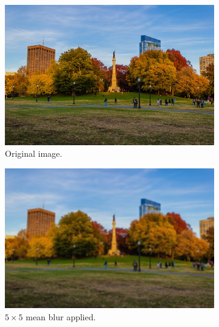 \documentclass{article}
\begin{document}
\begin{example}
      \begin{figure}[H]
        \centering
        \begin{subfigure}[b]{0.32\textwidth}
        \centering
            \includegraphics[width=\textwidth]{img/Park_Full.png}
            \caption{Original image. }
            \label{fig:Park_Full}
        \end{subfigure}
        \begin{subfigure}[b]{0.32\textwidth}
        \centering
            \includegraphics[width=\textwidth]{img/Mean_Blur.png}
            \caption{$5 \times 5$ mean blur applied. }
            \label{fig:Mean_Blur}
        \end{subfigure}
        \begin{subfigure}[b]{0.32\textwidth}
        \centering

\end{subfigure}
\end{figure}
\end{example}
\end{document}
